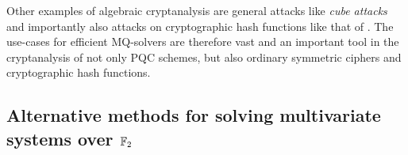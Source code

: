 Other examples of algebraic cryptanalysis are general attacks like \textit{cube attacks} \cite{Videau2011} and importantly also attacks on cryptographic hash functions like that of \cite{10.1007/978-3-642-21702-9_6}. The use-cases for efficient MQ-solvers are therefore vast and an important tool in the cryptanalysis of not only PQC schemes, but also ordinary symmetric ciphers and cryptographic hash functions. 

\subsection{Alternative methods for solving multivariate systems over $\mathbb{F}_2$}

\newpage